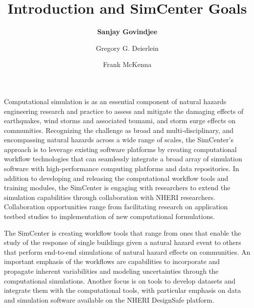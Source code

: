 %
%
%

\title{Introduction and SimCenter Goals}
\author{
    \textbf{Sanjay Govindjee}
    \and Gregory G. Deierlein
    \and Frank McKenna}
\tocauthor{}
%
%
\maketitle

Computational simulation is as an essential component of natural hazards engineering research and practice to assess and mitigate the damaging effects of earthquakes, wind storms and associated tsunami, and storm surge effects on communities. Recognizing the challenge as broad and multi-disciplinary, and encompassing natural hazards across a wide range of scales, the SimCenter's approach is to leverage existing software platforms by creating computational workflow technologies that can seamlessly integrate a broad array of simulation software with high-performance computing platforms and data repositories. In addition to developing and releasing the computational workflow tools and training modules, the SimCenter is engaging with researchers to extend the simulation capabilities through collaboration with NHERI researchers. Collaboration opportunities range from facilitating research on application testbed studies to implementation of new computational formulations.

The SimCenter is creating workflow tools that range from ones that enable the study of the response of single buildings given a natural hazard event to others that perform end-to-end simulations of natural hazard effects on communities. An important emphasis of the workflows are capabilities to incorporate and propagate inherent variabilities and modeling uncertainties through the computational simulations. Another focus is on tools to develop datasets and integrate them with the computational tools, with particular emphasis on data and simulation software available on the NHERI DesignSafe platform.

